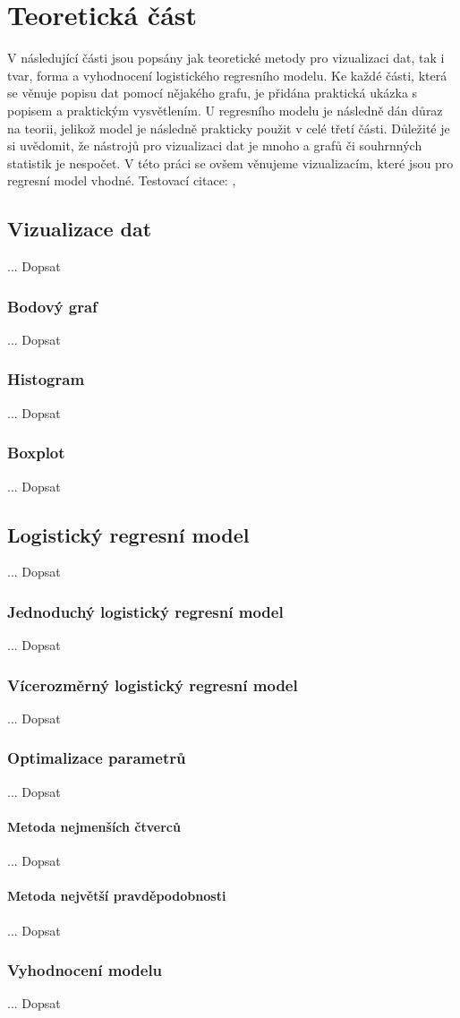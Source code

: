 \chapter{Teoretická část}
V následující části jsou popsány jak teoretické metody pro vizualizaci dat, tak i tvar, forma a vyhodnocení logistického regresního modelu. 
Ke každé části, která se věnuje popisu dat pomocí nějakého grafu, je přidána praktická ukázka s popisem a praktickým vysvětlením. U regresního 
modelu je následně dán důraz na teorii, jelikož model je následně prakticky použit v celé třetí části. Důležité je si uvědomit, že nástrojů pro
vizualizaci dat je mnoho a grafů či souhrnných statistik je nespočet. V této práci se ovšem věnujeme vizualizacím, které jsou pro regresní model
vhodné.
Testovací citace: \cite{Hebak2015}, \cite{Kleinbaum2010}
\section{Vizualizace dat}
... Dopsat

\subsection{Bodový graf}
... Dopsat

\subsection{Histogram}
... Dopsat

\subsection{Boxplot}
... Dopsat

\newpage

\section{Logistický regresní model}
... Dopsat

\subsection{Jednoduchý logistický regresní model}
... Dopsat

\subsection{Vícerozměrný logistický regresní model}
... Dopsat

\subsection{Optimalizace parametrů}
... Dopsat

\subsubsection{Metoda nejmenších čtverců}
... Dopsat

\subsubsection{Metoda největší pravděpodobnosti}
... Dopsat

\subsection{Vyhodnocení modelu}
... Dopsat

